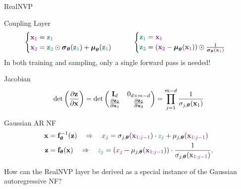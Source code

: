 \documentclass{beamer}
\renewcommand{\eqpause}{}
\renewcommand{\nextonslide}[1]{#1}
\begin{document}
\begin{frame}{RealNVP}
	\begin{block}{Coupling Layer}
		\vspace{-0.7cm}
		\[
		 \begin{cases} {\color{violet}\mathbf{x}_1} = {\color{teal}\mathbf{z}_1} \\ {\color{violet}\mathbf{x}_2} = {\color{teal}\mathbf{z}_2} \odot \boldsymbol{\sigma}_{\boldsymbol{\theta}}({\color{teal}\mathbf{z}_1}) + \boldsymbol{\mu}_{\boldsymbol{\theta}}({\color{teal}\mathbf{z}_1}) \end{cases}
			\qquad
		\begin{cases} {\color{teal}\mathbf{z}_1} ={\color{violet} \mathbf{x}_1} \\ {\color{teal}\mathbf{z}_2} = ({\color{violet}\mathbf{x}_2} - \boldsymbol{\mu}_{\boldsymbol{\theta}}({\color{violet}\mathbf{x}_1})) \odot \frac{1}{\boldsymbol{\sigma}_{\boldsymbol{\theta}}({\color{violet}\mathbf{x}_1})} \end{cases}
		\]
		In both training and sampling, only a single forward pass is needed!
	\end{block}
	\eqpause
	\vspace{-0.3cm}
	\begin{block}{Jacobian}
		\vspace{-0.5cm}
		\[
			\det \left( \frac{\partial \bz}{\partial \bx} \right) = \det 
			\begin{pmatrix}
				\bI_d & 0_{d \times m-d} \\
				\frac{\partial \bz_2}{\partial \bx_1} & \frac{\partial \bz_2}{\partial \bx_2}
			\end{pmatrix} \nextonslide{ = \prod_{j=1}^{m-d} \frac{1}{\sigma_{j, \btheta}(\bx_1)}}
		\]
		\vspace{-0.5cm}
	\end{block}
	\eqpause
	\begin{block}{Gaussian AR NF}
		\vspace{-0.7cm}
		\begin{align*}
				\mathbf{x} &= \mathbf{f}^{-1}_{\boldsymbol{\theta}}(\mathbf{z}) \quad \Rightarrow \quad {\color{violet}x_j} = \sigma_{j, \boldsymbol{\theta}} ({\color{violet}\mathbf{x}_{1:j-1}}) \cdot {\color{teal} z_j} + \mu_{j, \boldsymbol{\theta}}({\color{violet}\mathbf{x}_{1:j-1}}) \\
				\mathbf{z} &= \mathbf{f}_{\boldsymbol{\theta}}(\mathbf{x}) \quad \Rightarrow \quad {\color{teal} z_j} = \left({\color{violet} x_j} - \mu_{j, \boldsymbol{\theta}}({\color{violet}\mathbf{x}_{1:j-1}}) \right) \cdot \frac{1}{\sigma_{j, \boldsymbol{\theta}} ({\color{violet} \mathbf{x}_{1:j-1}}) }.
		\end{align*}
		\vspace{-0.5cm}
	\end{block}
	How can the RealNVP layer be derived as a special instance of the Gaussian autoregressive NF?
	
\end{frame}
\end{document}
